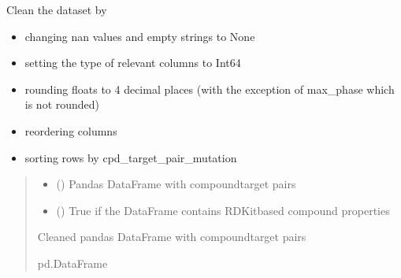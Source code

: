 \documentclass[letterpaper,10pt,english]{sphinxmanual}
\begin{document}
\begin{fulllineitems}
\label{\detokenize{clean_dataset:clean_dataset.clean_dataset}}
\pysigstartsignatures
{}
\pysigstopsignatures
\sphinxAtStartPar
Clean the dataset by
\begin{itemize}
\item {} 
\sphinxAtStartPar
changing nan values and empty strings to None

\item {} 
\sphinxAtStartPar
setting the type of relevant columns to Int64

\item {} 
\sphinxAtStartPar
rounding floats to 4 decimal places (with the exception of max\_phase which is not rounded)

\item {} 
\sphinxAtStartPar
reordering columns

\item {} 
\sphinxAtStartPar
sorting rows by cpd\_target\_pair\_mutation

\end{itemize}
\begin{quote}\begin{description}
\begin{itemize}
\item {} 
\sphinxAtStartPar
{} () \textendash{} Pandas DataFrame with compound\sphinxhyphen{}target pairs

\item {} 
\sphinxAtStartPar
{} () \textendash{} True if the DataFrame contains RDKit\sphinxhyphen{}based compound properties

\end{itemize}

\sphinxAtStartPar
Cleaned pandas DataFrame with compound\sphinxhyphen{}target pairs

\sphinxAtStartPar
pd.DataFrame

\end{description}\end{quote}

\end{fulllineitems}
\end{document}
